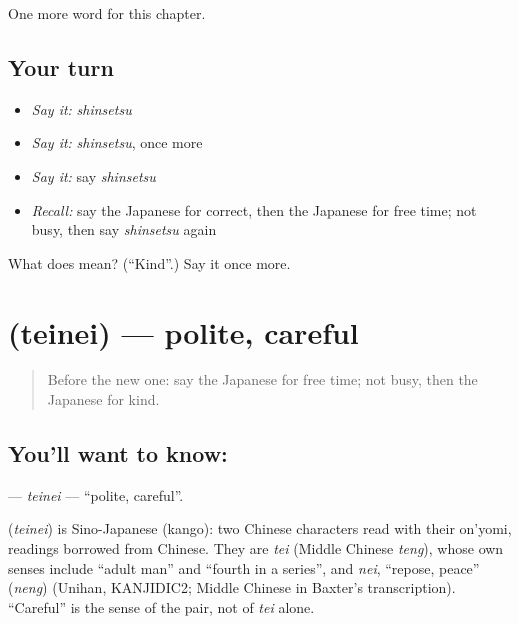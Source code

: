 \begin{grammarlens}[title={What you've built}]
One more word for this chapter.
\end{grammarlens}

\subsection*{Your turn}
\begin{itemize}
\raggedright
  \item \emph{Say it:} \emph{shinsetsu}
  \item \emph{Say it:} \emph{shinsetsu}, once more
  \item \emph{Say it:} say \emph{shinsetsu}
  \item \emph{Recall:} say the Japanese for correct, then the Japanese for free time; not busy, then say \emph{shinsetsu} again
\end{itemize}

\begin{tcolorbox}[breakable,colback=teal!4,colframe=teal!35!black,title={Before you move on}]
What does  mean? (\textquotedblleft{}Kind\textquotedblright{}.) Say it once more.
\end{tcolorbox}
\section[\texorpdfstring{\ja{ていねい} (teinei)}{ていねい (teinei)}]{ (teinei) — polite, careful}

\label{lesson:JA-C120-teinei}



\begin{quote}
Before the new one: say the Japanese for free time; not busy, then the Japanese for kind.
\end{quote}

\subsection*{You'll want to know: }
\textbf{} — \emph{teinei} — \textquotedblleft{}polite, careful\textquotedblright{}.

\begin{cousinweb}
\textbf{} (\emph{teinei}) is Sino-Japanese (kango): two Chinese characters read with their on'yomi, readings borrowed from Chinese. They are \emph{tei} (Middle Chinese \emph{teng}), whose own senses include \textquotedblleft{}adult man\textquotedblright{} and \textquotedblleft{}fourth in a series\textquotedblright{}, and \emph{nei}, \textquotedblleft{}repose, peace\textquotedblright{} (\emph{neng}) (Unihan, KANJIDIC2; Middle Chinese in Baxter's transcription). \textquotedblleft{}Careful\textquotedblright{} is the sense of the pair, not of \emph{tei} alone.
\end{cousinweb}

